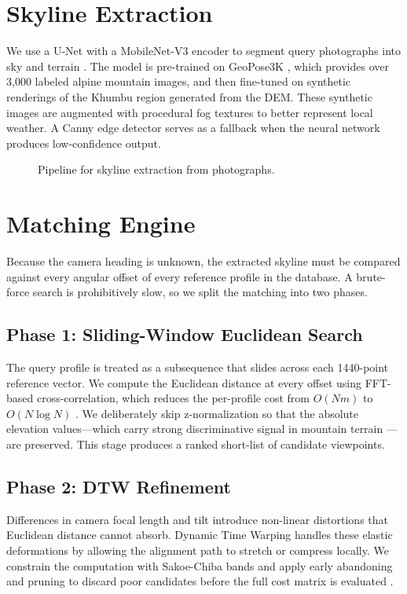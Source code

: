 \section{Skyline Extraction}
We use a U-Net with a MobileNet-V3 encoder to segment query photographs into sky and terrain \cite{long2015fully, howard2019mobilenetv3}. The model is pre-trained on GeoPose3K \cite{Brejcha2017}, which provides over 3,000 labeled alpine mountain images, and then fine-tuned on synthetic renderings of the Khumbu region generated from the DEM. These synthetic images are augmented with procedural fog textures to better represent local weather. A Canny edge detector \cite{Canny1986} serves as a fallback when the neural network produces low-confidence output.

\begin{figure}[htbp]
    \centering
    \resizebox{\textwidth}{!}{}
    \caption{Pipeline for skyline extraction from photographs.}
    \label{fig:skyline_extract}
\end{figure}

\section{Matching Engine}
Because the camera heading is unknown, the extracted skyline must be compared against every angular offset of every reference profile in the database. A brute-force search is prohibitively slow, so we split the matching into two phases.

\subsection{Phase 1: Sliding-Window Euclidean Search}
The query profile is treated as a subsequence that slides across each 1440-point reference vector. We compute the Euclidean distance at every offset using FFT-based cross-correlation, which reduces the per-profile cost from $O(Nm)$ to $O(N \log N)$ \cite{mueen2024mass, Rakthanmanon2013}. We deliberately skip z-normalization so that the absolute elevation values---which carry strong discriminative signal in mountain terrain \cite{tonge2014parsing}---are preserved. This stage produces a ranked short-list of candidate viewpoints.

\subsection{Phase 2: DTW Refinement}
Differences in camera focal length and tilt introduce non-linear distortions that Euclidean distance cannot absorb. Dynamic Time Warping handles these elastic deformations by allowing the alignment path to stretch or compress locally. We constrain the computation with Sakoe-Chiba bands and apply early abandoning and pruning to discard poor candidates before the full cost matrix is evaluated \cite{Rakthanmanon2013}.

